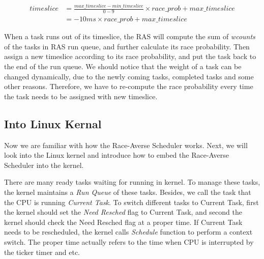 \begin{equation}
\begin{aligned}
    timeslice &= \frac{max\_timeslice-min\_timeslice}{0-9}\times race\_prob+max\_timeslice\\
    &= -10ms\times race\_prob + max\_timeslice
\end{aligned}
\end{equation}

When a task runs out of its timeslice, the RAS will compute the sum of \textit{wcounts} of the tasks in RAS run queue, and further calculate its race probability. Then assign a new timeslice according to its race probability, and put the task back to the end of the run queue. We should notice that the weight of a task can be changed dynamically, due to the newly coming tasks, completed tasks and some other reasons. Therefore, we have to re-compute the race probability every time the task needs to be assigned with new timeslice.

\subsection{Into Linux Kernal}

Now we are familiar with how the Race-Averse Scheduler works. Next, we will look into the Linux kernel and introduce how to embed the Race-Averse Scheduler into the kernel.

There are many ready tasks waiting for running in kernel. To manage these tasks, the kernel maintains a \textit{Run Queue} of these tasks. Besides, we call the task that the CPU is running \textit{Current Task}. To switch different tasks to Current Task, first the kernel should set the \textit{Need Resched} flag to Current Task, and second the kernel should check the Need Resched flag at a proper time. If Current Task needs to be rescheduled, the kernel calls \textit{Schedule} function to perform a context switch. The proper time actually refers to the time when CPU is interrupted by the ticker timer and etc. 

